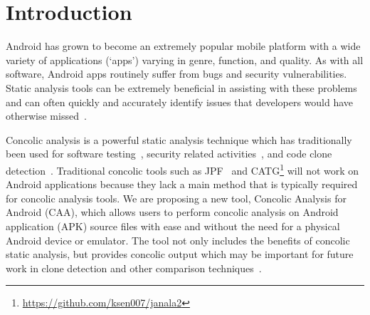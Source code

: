 \documentclass{sig-alternate}
\newcommand{\todo}[1]{\textcolor{cyan}{\textbf{[#1]}}}
\begin{document}
\section{Introduction}


Android has grown to become an extremely popular mobile platform with a wide variety of applications (`apps') varying in genre, function, and quality. As with all software, Android apps routinely suffer from bugs and security vulnerabilities. Static analysis tools can be extremely beneficial in assisting with these problems and can often quickly and accurately identify issues that developers would have otherwise missed~\cite{Ware:2008:SJC:1394504.1394506, Feng:2014:ASD:2635868.2635869}. %



Concolic analysis is a powerful static analysis technique which has traditionally been used for software testing~\cite{Sen:2005:CCU:1081706.1081750}, security related activities~\cite{Chen:2014:CIB:2554850.2554875}, and code clone detection~\cite{Krutz_Sac15}. Traditional concolic tools such as JPF~\cite{visser2003model} and CATG\footnote{\url{https://github.com/ksen007/janala2}} will not work on Android applications because they lack a main method that is typically required for concolic analysis tools. We are proposing a new tool, Concolic Analysis for Android (CAA), which allows users to perform concolic analysis on Android application (APK) source files with ease and without the need for a physical Android device or emulator. The tool not only includes the benefits of concolic static analysis, but provides concolic output which may be important for future work in clone detection and other comparison techniques~\cite{Krutz_Sac15,Anand:2012:ACT:2393596.2393666}.

\end{document}

